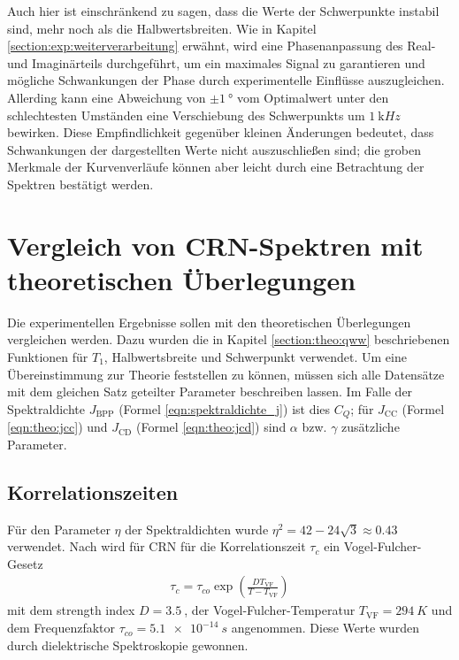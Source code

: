 Auch hier ist einschränkend zu sagen, dass die Werte der Schwerpunkte instabil sind, mehr noch als die Halbwertsbreiten. Wie in Kapitel \ref{section:exp:weiterverarbeitung} erwähnt, wird eine Phasenanpassung des Real- und Imaginärteils durchgeführt, um ein maximales Signal zu garantieren und mögliche Schwankungen der Phase durch experimentelle Einflüsse auszugleichen. Allerding kann eine Abweichung von $\pm \SI{1}{\degree}$ vom Optimalwert unter den schlechtesten Umständen eine Verschiebung des Schwerpunkts um $\SI{1}{\kilo Hz}$ bewirken. Diese Empfindlichkeit gegenüber kleinen Änderungen bedeutet, dass Schwankungen der dargestellten Werte nicht auszuschließen sind; die groben Merkmale der Kurvenverläufe können aber leicht durch eine Betrachtung der Spektren bestätigt werden.




\section{Vergleich von CRN-Spektren mit theoretischen Überlegungen} \label{section:res:theorie}

Die experimentellen Ergebnisse sollen mit den theoretischen Überlegungen vergleichen werden. Dazu wurden die in Kapitel \ref{section:theo:qww} beschriebenen Funktionen für $T_1$, Halbwertsbreite und Schwerpunkt verwendet. Um eine Übereinstimmung zur Theorie feststellen zu können, müssen sich alle Datensätze mit dem gleichen Satz geteilter Parameter beschreiben lassen. Im Falle der Spektraldichte $J_\text{BPP}$ (Formel \eqref{eqn:spektraldichte_j}) ist dies $C_Q$; für $J_\text{CC}$ (Formel \eqref{eqn:theo:jcc}) und $J_\text{CD}$ (Formel \eqref{eqn:theo:jcd}) sind $\alpha$ bzw. $\gamma$ zusätzliche Parameter.


\subsection{Korrelationszeiten} \label{sub:res:tauc}

Für den Parameter $\eta$ der Spektraldichten wurde $\eta^2 = 42 - 24 \sqrt{3} \approx \SI{0.43}{}$ \cite{caer} verwendet. Nach \cite{PIMENOV199793} wird für CRN für die Korrelationszeit $\tau_c$ ein Vogel-Fulcher-Gesetz
\begin{align}
	\tau_c = \tau_{co} \exp \left( \frac{D T_\text{VF}}{T-T_\text{VF}} \right)
\end{align}
mit dem strength index $D = \SI{3.5}{}$, der Vogel-Fulcher-Temperatur $T_\text{VF} = \SI{294}{K}$ und dem Frequenzfaktor $\tau_{co} = \SI{5.1e-14}{s}$ angenommen. Diese Werte wurden durch dielektrische Spektroskopie gewonnen.

